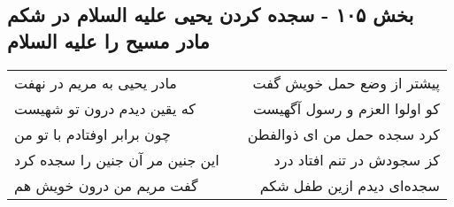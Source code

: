 \begin{center}
\section*{بخش ۱۰۵ - سجده کردن یحیی علیه السلام در شکم  مادر مسیح را علیه السلام}
\label{sec:sh105}
\begin{longtable}{l p{0.5cm} r}
مادر یحیی به مریم در نهفت
&&
پیشتر از وضع حمل خویش گفت
\\
که یقین دیدم درون تو شهیست
&&
کو اولوا العزم و رسول آگهیست
\\
چون برابر اوفتادم با تو من
&&
کرد سجده حمل من ای ذوالفطن
\\
این جنین مر آن جنین را سجده کرد
&&
کز سجودش در تنم افتاد درد
\\
گفت مریم من درون خویش هم
&&
سجده‌ای دیدم ازین طفل شکم
\\
\end{longtable}
\end{center}
